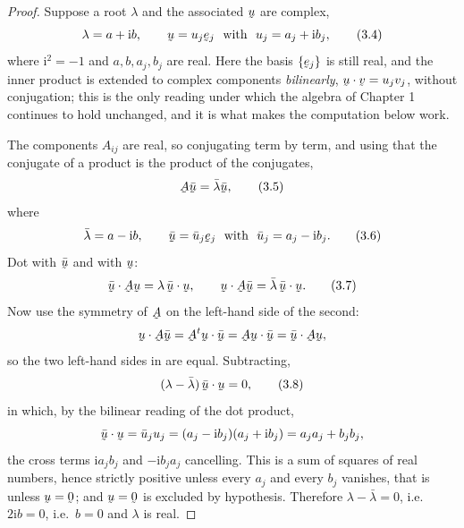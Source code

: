 \begin{proof}
Suppose a root $\lambda$ and the associated $\bu$ are complex,
\begin{equation}
   \lambda=a+\mathrm{i}b,\qquad
   \bu=u_{j}\be_{j}\ \text{ with }\ u_{j}=a_{j}+\mathrm{i}b_{j},
   \tag{3.4}\label{eq:3.4}
\end{equation}
where $\mathrm{i}^{2}=-1$ and $a,b,a_{j},b_{j}$ are real. Here the basis
$\{\be_{j}\}$ is still real, and the inner product is extended to complex
components \emph{bilinearly}, $\ip\bu\bv=u_{j}v_{j}$, without conjugation;
this is the only reading under which the algebra of Chapter 1 continues to
hold unchanged, and it is what makes the computation below work.

The components $A_{ij}$ are real, so conjugating  term by term, and
using that the conjugate of a product is the product of the conjugates,
\begin{equation}
   \bA\bar\bu=\bar\lambda\bar\bu,
   \tag{3.5}\label{eq:3.5}
\end{equation}
where
\begin{equation}
   \bar\lambda=a-\mathrm{i}b,\qquad
   \bar\bu=\bar u_{j}\be_{j}\ \text{ with }\
   \bar u_{j}=a_{j}-\mathrm{i}b_{j}.
   \tag{3.6}\label{eq:3.6}
\end{equation}
Dot  with $\bar\bu$ and  with $\bu$:
\begin{equation}
   \ip{\bar\bu}{\bA\bu}=\lambda\,\ip{\bar\bu}\bu,
   \qquad
   \ip{\bu}{\bA\bar\bu}=\bar\lambda\,\ip{\bar\bu}\bu .
   \tag{3.7}\label{eq:3.7}
\end{equation}
Now use the symmetry of $\bA$ on the left-hand side of the second:
\[
   \ip{\bu}{\bA\bar\bu}=\ip{\bA^{t}\bu}{\bar\bu}=\ip{\bA\bu}{\bar\bu}
   =\ip{\bar\bu}{\bA\bu},
\]
so the two left-hand sides in  are equal. Subtracting,
\begin{equation}
   (\lambda-\bar\lambda)\,\ip{\bar\bu}\bu=0,
   \tag{3.8}\label{eq:3.8}
\end{equation}
in which, by the bilinear reading of the dot product,
\[
   \ip{\bar\bu}\bu=\bar u_{j}u_{j}
   =(a_{j}-\mathrm{i}b_{j})(a_{j}+\mathrm{i}b_{j})
   =a_{j}a_{j}+b_{j}b_{j},
\]
the cross terms $\mathrm{i}a_{j}b_{j}$ and $-\mathrm{i}b_{j}a_{j}$
cancelling. This is a sum of squares of real numbers, hence strictly
positive unless every $a_{j}$ and every $b_{j}$ vanishes, that is unless
$\bu=\bze$; and $\bu=\bze$ is excluded by hypothesis. Therefore
$\lambda-\bar\lambda=0$, i.e.\ $2\mathrm{i}b=0$, i.e.\ $b=0$ and $\lambda$
is real.
\end{proof}


